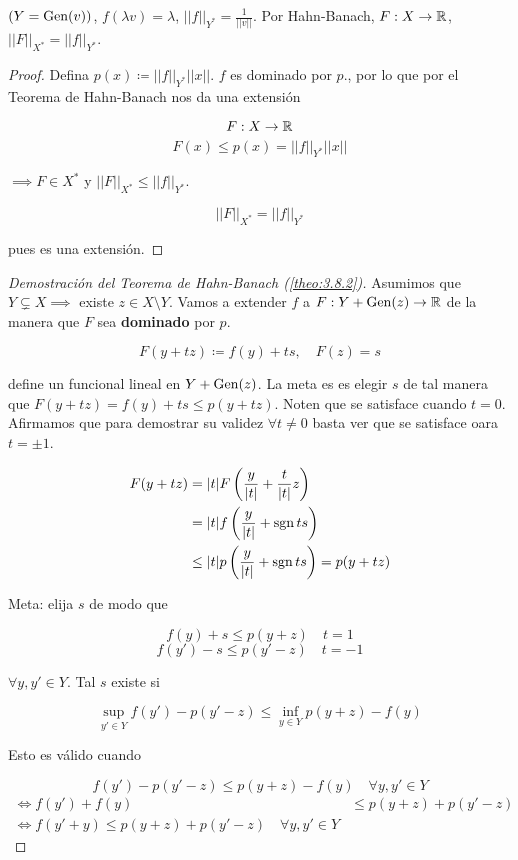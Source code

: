 $(Y=\operatorname{Gen}(v))$, $f(\lambda v)=\lambda$, $||f||_{Y^*}=\frac{1}{||v||}$. Por Hahn-Banach, $F:X\to\mathbb{R}$, $||F||_{X^*}=||f||_{Y^*}$.

\begin{proof}
    Defina $p(x)\coloneqq ||f||_{Y^*}||x||$. $f$ es dominado por $p$., por lo que por el Teorema de Hahn-Banach nos da una extensión 

    \[F:X\to\mathbb{R}\]
    \[F(x)\leq p(x)=||f||_{Y^*}||x||\]

    $\implies F\in X^*$ y $||F||_{X^*}\leq ||f||_{Y^*}$.

    \[||F||_{X^*}=||f||_{Y^*}\]

    pues es una extensión.
\end{proof}

\begin{proof}[Demostración del Teorema de Hahn-Banach (\ref{theo:3.8.2})]
    Asumimos que $Y\subsetneq X\implies $ existe $z\in X\setminus Y$. Vamos a extender $f$ a $F:Y+\operatorname{Gen}(z)\to \mathbb{R}$ de la manera que $F$ sea \textbf{dominado} por $p$.

    \[F(y+tz)\coloneqq f(y)+t s,\quad F(z)=s\]

    define un funcional lineal en $Y+\operatorname{Gen}(z)$. La meta es es elegir $s$ de tal manera que $F(y+tz)=f(y)+ts\leq p(y+tz)$. Noten que se satisface cuando $t=0$. Afirmamos que para demostrar su validez $\forall t\neq 0$ basta ver que se satisface oara $t=\pm 1$.

    \begin{align*}
        F(y+tz)&=|t|F\left(\frac{y}{|t|}+\frac{t}{|t|}z\right)\\
        &=|t|f\left(\frac{y}{|t|}+\operatorname{sgn} ts\right)\\
        &\leq |t| p\left(\frac{y}{|t|}+\operatorname{sgn} ts\right)=p(y+tz)
    \end{align*}

    Meta: elija $s$ de modo que 

    \[f(y)+s\leq p(y+z)\quad t=1\]
    \[f(y')-s\leq p(y'-z)\quad t=-1\]

    $\forall y,y'\in Y$. Tal $s$ existe si 

    \[\sup_{y'\in Y} f(y')-p(y'-z)\leq \inf_{y\in Y} p(y+z)-f(y)\]

    Esto es válido cuando 

    \[f(y')-p(y'-z)\leq p(y+z)-f(y)\quad\forall y,y'\in Y\]
    \begin{align*}
        \iff f(y')+f(y)&\leq p(y+z)+p(y'-z)\\
        \iff f(y'+y)\leq p(y+z)+p(y'-z)\quad\forall y,y'\in Y
    \end{align*}


\end{proof}
